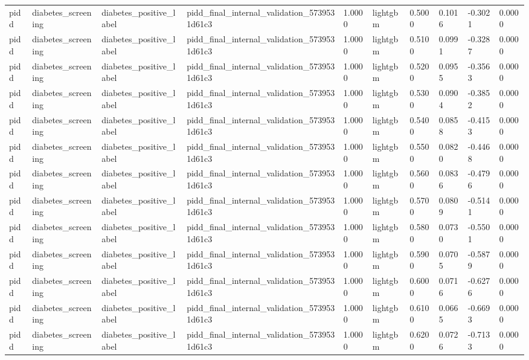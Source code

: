 \begin{tabular}{llllllllll}
pidd & diabetes\_screening & diabetes\_positive\_label & pidd\_final\_internal\_validation\_5739531d61c3 & 1.0000 & lightgbm & 0.5000 & 0.1016 & -0.3021 & 0.0000 \\
pidd & diabetes\_screening & diabetes\_positive\_label & pidd\_final\_internal\_validation\_5739531d61c3 & 1.0000 & lightgbm & 0.5100 & 0.0991 & -0.3287 & 0.0000 \\
pidd & diabetes\_screening & diabetes\_positive\_label & pidd\_final\_internal\_validation\_5739531d61c3 & 1.0000 & lightgbm & 0.5200 & 0.0955 & -0.3563 & 0.0000 \\
pidd & diabetes\_screening & diabetes\_positive\_label & pidd\_final\_internal\_validation\_5739531d61c3 & 1.0000 & lightgbm & 0.5300 & 0.0904 & -0.3852 & 0.0000 \\
pidd & diabetes\_screening & diabetes\_positive\_label & pidd\_final\_internal\_validation\_5739531d61c3 & 1.0000 & lightgbm & 0.5400 & 0.0858 & -0.4153 & 0.0000 \\
pidd & diabetes\_screening & diabetes\_positive\_label & pidd\_final\_internal\_validation\_5739531d61c3 & 1.0000 & lightgbm & 0.5500 & 0.0820 & -0.4468 & 0.0000 \\
pidd & diabetes\_screening & diabetes\_positive\_label & pidd\_final\_internal\_validation\_5739531d61c3 & 1.0000 & lightgbm & 0.5600 & 0.0836 & -0.4796 & 0.0000 \\
pidd & diabetes\_screening & diabetes\_positive\_label & pidd\_final\_internal\_validation\_5739531d61c3 & 1.0000 & lightgbm & 0.5700 & 0.0809 & -0.5141 & 0.0000 \\
pidd & diabetes\_screening & diabetes\_positive\_label & pidd\_final\_internal\_validation\_5739531d61c3 & 1.0000 & lightgbm & 0.5800 & 0.0730 & -0.5501 & 0.0000 \\
pidd & diabetes\_screening & diabetes\_positive\_label & pidd\_final\_internal\_validation\_5739531d61c3 & 1.0000 & lightgbm & 0.5900 & 0.0705 & -0.5879 & 0.0000 \\
pidd & diabetes\_screening & diabetes\_positive\_label & pidd\_final\_internal\_validation\_5739531d61c3 & 1.0000 & lightgbm & 0.6000 & 0.0716 & -0.6276 & 0.0000 \\
pidd & diabetes\_screening & diabetes\_positive\_label & pidd\_final\_internal\_validation\_5739531d61c3 & 1.0000 & lightgbm & 0.6100 & 0.0665 & -0.6693 & 0.0000 \\
pidd & diabetes\_screening & diabetes\_positive\_label & pidd\_final\_internal\_validation\_5739531d61c3 & 1.0000 & lightgbm & 0.6200 & 0.0726 & -0.7133 & 0.0000 \\

\end{tabular}
